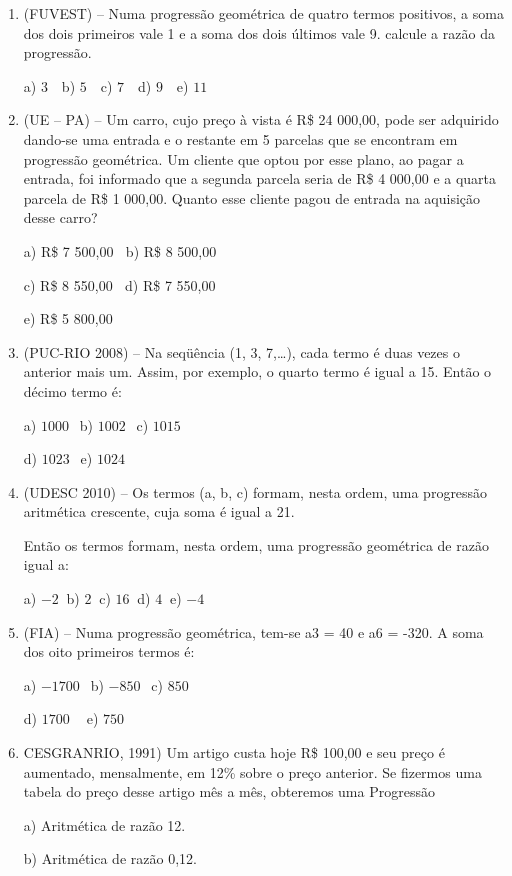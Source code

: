 \begin{multicols*}{2}
\begin{enumerate}
\item  (FUVEST) – Numa progressão geométrica de quatro termos positivos, a soma dos dois primeiros vale 1 e a soma dos dois últimos vale 9. calcule a razão da progressão.

		a) $3 \ \ \ $ b) $5 \ \ \ $ c) $7 \ \ \ $ d) $9 \ \ \ $ e) $11$

	\item (UE – PA) – Um carro, cujo preço à vista é R\$ 24 000,00, pode ser adquirido dando-se uma entrada e o restante em 5 parcelas que se encontram em progressão geométrica. Um cliente que optou por esse plano, ao pagar a entrada, foi informado que a segunda parcela seria de R\$ 4 000,00 e a quarta parcela de R\$ 1 000,00. Quanto esse cliente pagou de entrada na aquisição desse carro?

a) R\$ 7 500,00 $ \ $ b) R\$ 8 500,00

c) R\$ 8 550,00 $ \ $ d) R\$ 7 550,00

e) R\$ 5 800,00

\item  (PUC-RIO 2008) – Na seqüência (1, 3, 7,…), cada termo é duas vezes o anterior mais um. Assim, por exemplo, o quarto termo é igual a 15. Então o décimo termo é:

		a) $1000 \ \ $ b) $1002 \ \ $ c) $1015 \ \ $ 
		
		d) $1023 \ \ $ e) $1024 $
		
\item (UDESC 2010) – Os termos (a, b, c) formam, nesta ordem, uma progressão aritmética crescente, cuja soma é igual a 21.

Então os termos formam, nesta ordem, uma progressão geométrica de razão igual a:

		a) $-2 \ $ b) $2 \ $ c) $16 \ $ d) $4 \ $ e) $-4$
		
\item (FIA) – Numa progressão geométrica, tem-se a3 = 40 e a6 = -320. A soma dos oito primeiros termos é:

		a) $-1700 \ \ $ b) $-850 \ \ $ c) $850 \ \ $ 
		
		d) $1700 \ \ \ \ $ e) $750 $

\item CESGRANRIO, 1991) Um artigo custa hoje R\$ 100,00 e seu preço é aumentado, mensalmente, em 12\% sobre o preço anterior. Se fizermos uma tabela do preço desse artigo mês a mês, obteremos uma Progressão

a) Aritmética de razão 12.

b) Aritmética de razão 0,12.


\end{enumerate}
\end{multicols*}
